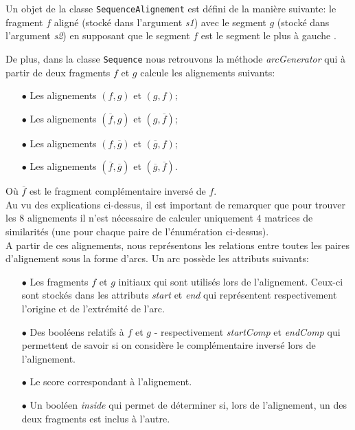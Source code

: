 Un objet de la classe \verb|SequenceAlignement| est défini de la manière
suivante: le fragment $f$ aligné (stocké dans l'argument \emph{s1}) avec le segment $g$ (stocké dans l'argument \emph{s2}) en supposant que le
segment $f$ est le segment le plus à \og gauche \fg.

De plus,  dans la classe \verb|Sequence| nous retrouvons la méthode \emph{arcGenerator} qui à partir de deux fragments $f$ et $g$ calcule les alignements suivants:\\
\begin{itemize}
	\item[$\bullet$] Les alignements $(f,g)$ et $(g,f)$;
	\item[$\bullet$] Les alignements $(\overline{f},g)$ et $(g, \overline{f})$;
	\item[$\bullet$] Les alignements $(f, \overline{g})$ et $(\overline{g},f)$;
	\item[$\bullet$] Les alignements  $(\overline{f}, \overline{g})$ et $(\overline{g}, \overline{f})$.
\end{itemize}
Où $\overline{f}$ est le fragment complémentaire inversé de $f$.\\
Au vu des explications ci-dessus, il est important de remarquer que pour trouver les 8 alignements il n'est nécessaire de calculer uniquement 4 matrices de similarités (une pour chaque paire de l'énumération ci-dessus).\\

A partir de ces alignements, nous représentons les relations entre toutes les paires d'alignement sous la forme d'arcs. Un arc possède les attributs suivants:\\

\begin{itemize}
	\item[$\bullet$] Les fragments $f$ et $g$ initiaux qui sont utilisés lors de l'alignement. Ceux-ci sont stockés dans les attributs \emph{start} et \emph{end} qui représentent respectivement l'origine et de l'extrémité de l'arc.
	\item[$\bullet$] Des booléens relatifs à $f$ et $g$ - respectivement \emph{startComp} et \emph{endComp} qui permettent de savoir si on considère le complémentaire inversé lors de l'alignement.
	\item[$\bullet$] Le score correspondant à l'alignement.
	\item[$\bullet$] Un booléen \emph{inside} qui permet de déterminer si, lors de l'alignement, un des deux fragments est inclus à l'autre.
	
\end{itemize}

